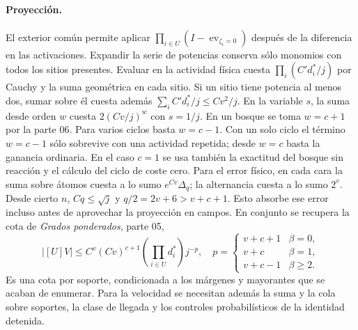 \paragraph{Proyección.}
El exterior común permite aplicar $\prod_{i\in U}(I-\operatorname{ev}_{\zeta_i=0})$
después de la diferencia en las activaciones. Expandir la serie de potencias conserva
sólo monomios con todos los sitios presentes. Evaluar en la actividad física cuesta
$\prod_i(C'd_i^*/j)$ por Cauchy y la suma geométrica en cada sitio. Si un sitio
tiene potencia al menos dos, sumar sobre él cuesta además $\sum_i C'd_i^*/j\le Cv^2/j$.
En la variable $s$, la suma desde orden $w$ cuesta $2(Cv/j)^w$ con $s=1/j$.
En un bosque se toma $w=c+1$ por la parte 06. Para varios ciclos basta $w=c-1$.
Con un solo ciclo el término $w=c-1$ sólo sobrevive con una actividad repetida;
desde $w=c$ basta la ganancia ordinaria. En el caso $c=1$ se usa también la
exactitud del bosque sin reacción y el cálculo del ciclo de coste cero.
Para el error físico, en cada cara la suma sobre átomos cuesta a lo sumo $e^{Cv}\Delta_q$;
la alternancia cuesta a lo sumo $2^v$. Desde cierto $n$, $Cq\le\sqrt{j}$ y
$q/2=2v+6>v+c+1$. Esto absorbe ese error incluso antes de aprovechar la proyección
en campos. En conjunto se recupera la cota de \emph{Grados ponderados}, parte 05,
\[
 |[U]V|\le C^v(Cv)^{c+1}\left(\prod_{i\in U}d_i^*\right)j^{-p},\quad
 p=\begin{cases}v+c+1&\beta=0,\\v+c&\beta=1,\\v+c-1&\beta\ge2.\end{cases}
\]
Es una cota por soporte, condicionada a los márgenes y mayorantes que se acaban de
enumerar. Para la velocidad se necesitan además la suma y la cola sobre soportes,
la clase de llegada y los controles probabilísticos de la identidad detenida.
